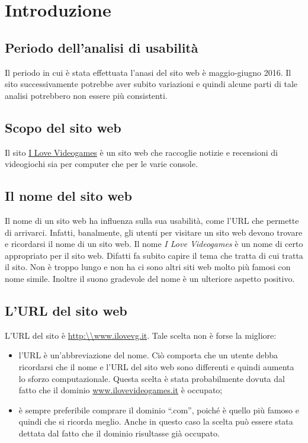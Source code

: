 \documentclass[../ProgettoTecWeb2.tex]{subfiles}
\begin{document}
\section{Introduzione}
	\subsection{Periodo dell'analisi di usabilità}
	Il periodo in cui è stata effettuata l'anasi del sito web è maggio-giugno 2016. Il sito successivamente potrebbe aver subito variazioni e quindi alcune parti di tale analisi potrebbero non essere più consistenti.

	\subsection{Scopo del sito web}
	Il sito \href{http://ilovevg.it/}{I Love Videogames} è un sito web che raccoglie notizie e  recensioni di videogiochi sia per computer che per le varie console.

	\subsection{Il nome del sito web}
	Il nome di un sito web ha influenza sulla sua usabilità, come l'URL che permette di arrivarci. Infatti, banalmente, gli utenti per visitare un sito web devono trovare e ricordarsi il nome di un sito web. Il nome \textit{I Love Videogames} è un nome di certo appropriato per il sito web. Difatti fa subito capire il tema che tratta di cui tratta il sito. Non è troppo lungo e non ha ci sono altri siti web molto più famosi con nome simile. Inoltre il suono gradevole del nome è un ulteriore aspetto positivo.

	\subsection{L'URL del sito web}
	L'URL del sito è \url{http:\\www.ilovevg.it}. Tale scelta non è forse la migliore:
	\begin{itemize}
		\item l'URL è un'abbreviazione del nome. Ciò comporta che un utente debba ricordarsi che il nome e l'URL del sito web sono differenti e quindi aumenta lo sforzo computazionale. Questa scelta è stata probabilmente dovuta dal fatto che il dominio \url{www.ilovevideogames.it} è occupato;
		\item è sempre preferibile comprare il dominio ``.com'', poiché è quello più famoso e quindi che si ricorda meglio. Anche in questo caso la scelta può essere stata dettata dal fatto che il dominio risultasse già occupato.
	\end{itemize}
\end{document}
